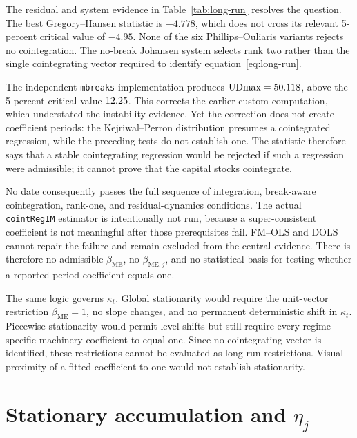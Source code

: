 \documentclass[11pt,a4paper]{article}
\begin{document}


The residual and system evidence in Table~\ref{tab:long-run} resolves the
question. The best Gregory--Hansen statistic is \(-4.778\), which does not
cross its relevant 5-percent critical value of \(-4.95\). None of the six
Phillips--Ouliaris variants rejects no cointegration. The no-break Johansen
system selects rank two rather than the single cointegrating vector required
to identify equation~\eqref{eq:long-run}.

The independent \texttt{mbreaks} implementation produces
\(\mathrm{UDmax}=50.118\), above the 5-percent critical value
\(12.25\). This corrects the earlier custom computation,
which understated the instability evidence. Yet the correction does not
create coefficient periods: the Kejriwal--Perron distribution presumes a
cointegrated regression, while the preceding tests do not establish one.
The statistic therefore says that a stable cointegrating regression would
be rejected if such a regression were admissible; it cannot prove that the
capital stocks cointegrate.

No date consequently passes the full sequence of integration, break-aware
cointegration, rank-one, and residual-dynamics conditions. The actual
\texttt{cointRegIM} estimator is intentionally not run, because a
super-consistent coefficient is not meaningful after those prerequisites
fail. FM--OLS and DOLS cannot repair the failure and remain excluded from the
central evidence. There is therefore no admissible
\(\beta_{\mathrm{ME}}\), no \(\beta_{\mathrm{ME},j}\), and no statistical
basis for testing whether a reported period coefficient equals one.

The same logic governs \(\kappa_t\). Global stationarity would require the
unit-vector restriction \(\beta_{\mathrm{ME}}=1\), no slope changes, and no
permanent deterministic shift in \(\kappa_t\). Piecewise stationarity would
permit level shifts but still require every regime-specific machinery
coefficient to equal one. Since no cointegrating vector is identified, these
restrictions cannot be evaluated as long-run restrictions. Visual proximity
of a fitted coefficient to one would not establish stationarity.

\FloatBarrier
\section{Stationary accumulation and
\texorpdfstring{\(\eta_j\)}{eta j}}
\end{document}
